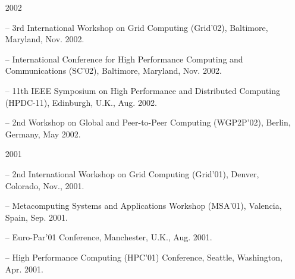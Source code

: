 \documentclass[times,11pt]{letter}
\begin{document}
\begin{itemize}
\item [2002]
\item[--]  3rd International Workshop on Grid Computing (Grid'02), Baltimore, Maryland, Nov. 2002.
\item[--]   International Conference for High Performance Computing and Communications (SC'02), Baltimore, Maryland, Nov. 2002.
\item[--]  11th IEEE Symposium on High Performance and Distributed Computing (HPDC-11), Edinburgh, U.K., Aug. 2002.
\item[--]  2nd Workshop on Global and Peer-to-Peer Computing (WGP2P'02), Berlin, Germany, May 2002. 

\item [2001]
\item[--]  2nd International Workshop on Grid Computing (Grid'01), Denver, Colorado, Nov., 2001.
\item[--]  Metacomputing Systems and Applications Workshop (MSA'01), Valencia, Spain, Sep. 2001.
\item[--]  Euro-Par'01 Conference, Manchester, U.K., Aug. 2001.
\item[--]  High Performance Computing (HPC'01) Conference, Seattle, Washington, Apr. 2001.

\end{itemize}
\end{document}

